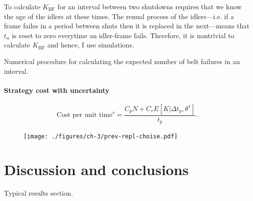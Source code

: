 To calculate $K_{\text{BF}}$ for an interval between two shutdowns requires that we know the age of the idlers at these times. The renual process of the idlers---i.e. if a frame failes in a period between shuts then it is replaced in the next---means that $t_n$ is reset to zero everytime an idler-frame fails. Therefore, it is nontrivial to calculate $K_{\text{BF}}$ and hence, I use simulations.

\begin{algorithm}
	\caption{Numerical procedure for calculating the expected number of belt failures in an interval.}
  \label{algo:K_BF}
	\begin{algorithmic}[1]

    \EndFor
	\end{algorithmic} 
\end{algorithm} 

\paragraph*{Strategy cost with uncertainty}

\begin{equation*}
  \text{Cost per unit time}^s = \frac{C_p N + C_r E[K|\Delta t_p,\theta^s]}{t_p}.
\end{equation*}

\begin{figure}
  \centering
  \texttt{[image: ./figures/ch-3/prev-repl-choise.pdf]}
  \caption{}
  \label{fig:preventative-repl-decision}
\end{figure}

\section{Discussion and conclusions} \label{sec:idler-frame-conclusions}

Typical results section.

